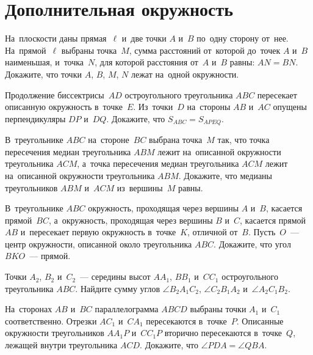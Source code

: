 
\section*{Дополнительная окружность}



\begin{problems}

\item
На~плоскости даны прямая~$\ell$ и~две точки $A$ и~$B$ по~одну сторону от~нее.
На~прямой~$\ell$ выбраны точка~$M$, сумма расстояний от~которой
до~точек $A$ и~$B$ наименьшая, и~точка~$N$, для которой расстояния
от~$A$ и~$B$ равны: $AN = BN$.
Докажите, что точки $A$, $B$, $M$, $N$ лежат на~одной окружности.

\item
Продолжение биссектрисы~$AD$ остроугольного треугольника $ABC$ пересекает
описанную окружность в~точке~$E$.
Из~точки~$D$ на~стороны $AB$ и~$AC$ опущены перпендикуляры $DP$ и~$DQ$.
Докажите, что $S_{ABC}= S_{APEQ}$.

\item
В~треугольнике $ABC$ на~стороне~$BC$ выбрана точка~$M$ так, что точка
пересечения медиан треугольника $ABM$ лежит на~описанной окружности
треугольника $ACM$, а~точка пересечения медиан треугольника $ACM$ лежит
на~описанной окружности треугольника $ABM$.
Докажите, что медианы треугольников $ABM$ и~$ACM$ из~вершины~$M$ равны.

\item
В~треугольнике $ABC$ окружность, проходящая через вершины $A$ и~$B$, касается
прямой~$BC$, а~окружность, проходящая через вершины $B$ и~$C$, касается
прямой~$AB$ и~пересекает первую окружность в~точке~$K$, отличной от~$B$.
Пусть~$O$~--- центр окружности, описанной около треугольника $ABC$.
Докажите, что угол $BKO$~--- прямой.

\item
Точки $A_2$, $B_2$ и~$C_2$~--- середины высот $A A_1$, $B B_1$ и~$C C_1$
остроугольного треугольника $ABC$.
Найдите сумму углов
$\angle B_2 A_1 C_2$, $\angle C_2 B_1 A_2$ и~$\angle A_2 C_1 B_2$.

\item
На~сторонах $AB$ и~$BC$ параллелограмма $ABCD$ выбраны точки $A_1$ и~$C_1$
соответственно.
Отрезки $A C_1$ и~$C A_1$ пересекаются в~точке~$P$.
Описанные окружности треугольников $A A_1 P$ и~$C C_1 P$ вторично пересекаются
в~точке~$Q$, лежащей внутри треугольника $ACD$.
Докажите, что $\angle PDA = \angle QBA$.


\end{problems}
